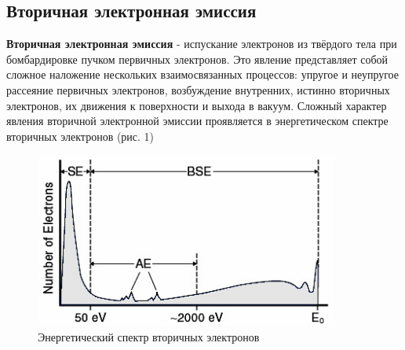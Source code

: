 \documentclass[a4paper]{article}
\begin{document}
\subsection{Вторичная электронная эмиссия}


\textbf{Вторичная электронная эмиссия} - испускание электронов из твёрдого тела при бомбардировке пучком первичных электронов. Это явление представляет собой сложное наложение нескольких взаимосвязанных процессов: упругое и неупругое рассеяние первичных электронов, возбуждение внутренних, истинно вторичных электронов, их движения к поверхности и выхода в вакуум. Сложный характер явления вторичной электронной эмиссии проявляется в энергетическом спектре вторичных электронов (рис. 1)

\begin{figure}[h]
\begin{center}
\includegraphics[width=10cm]{Electron_Spectrum.jpg}
\caption{Энергетический спектр вторичных электронов}
\label{ris:experimoriginal} %
\end{center}
\end{figure}
\end{document}
